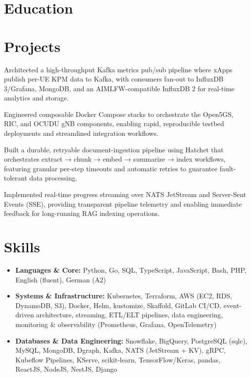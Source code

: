 \documentclass[10pt,a4paper]{resume}
\begin{document}
\section{Education}

\vspace{2pt}

\section{Projects}

\bullets
  \item Architected a high-throughput Kafka metrics pub/sub pipeline where xApps publish per-UE KPM data to Kafka, with consumers fan-out to InfluxDB 3/Grafana, MongoDB, and an AIMLFW-compatible InfluxDB 2 for real-time analytics and storage.
  \item Engineered composable Docker Compose stacks to orchestrate the Open5GS, RIC, and OCUDU gNB components, enabling rapid, reproducible testbed deployments and streamlined integration workflows.
\bulletsend
\vspace{1.0pt}
\bullets
  \item Built a durable, retryable document-ingestion pipeline using Hatchet that orchestrates extract → chunk → embed → summarize → index workflows, featuring granular per-step timeouts and automatic retries to guarantee fault-tolerant data processing.
  \item Implemented real-time progress streaming over NATS JetStream and Server-Sent Events (SSE), providing transparent pipeline telemetry and enabling immediate feedback for long-running RAG indexing operations.
\bulletsend

\section{Skills}

\begin{itemize}[leftmargin=1.4em,nosep,topsep=2pt]
  \item \textbf{Languages \& Core:} Python, Go, SQL, TypeScript, JavaScript, Bash, PHP, English (fluent), German (A2)
  \item \textbf{Systems \& Infrastructure:} Kubernetes, Terraform, AWS (EC2, RDS, DynamoDB, S3), Docker, Helm, kustomize, Skaffold, GitLab CI/CD, event-driven architecture, streaming, ETL/ELT pipelines, data engineering, monitoring \& observability (Prometheus, Grafana, OpenTelemetry)
  \item \textbf{Databases \& Data Engineering:} Snowflake, BigQuery, PostgreSQL (sqlc), MySQL, MongoDB, Dgraph, Kafka, NATS (JetStream + KV), gRPC, Kubeflow Pipelines, KServe, scikit-learn, TensorFlow/Keras, pandas, ReactJS, NodeJS, NestJS, Django
\end{itemize}
\end{document}
